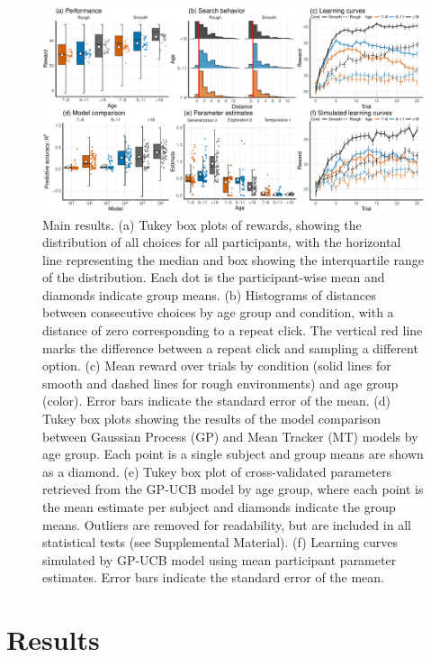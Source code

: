 \documentclass[a4paper,man, floatsintext, natbib]{apa6}
\begin{document}
\begin{figure}[ht!]
\centering
\includegraphics[width=\linewidth]{bigplot.pdf}
\caption{Main results. (a) Tukey box plots of rewards, showing the distribution of all choices for all participants, with the horizontal line representing the median and box showing the interquartile range of the distribution. Each dot is the participant-wise mean and diamonds indicate group means. (b) Histograms of distances between consecutive choices by age group and condition, with a distance of zero corresponding to a repeat click. The vertical red line marks the difference between a repeat click and sampling a different option. (c) Mean reward over trials by condition (solid lines for smooth and dashed lines for rough environments) and age group (color). Error bars indicate the standard error of the mean. (d) Tukey box plots showing the results of the model comparison between Gaussian Process (GP) and Mean Tracker (MT) models by age group. Each point is a single subject and group means are shown as a diamond. (e) Tukey box plot of cross-validated parameters retrieved from the GP-UCB model by age group, where each point is the mean estimate per subject and diamonds indicate the group means. Outliers are removed for readability, but are included in all statistical tests (see Supplemental Material). (f) Learning curves simulated by GP-UCB model using mean participant parameter estimates. Error bars indicate the standard error of the mean.} 
\label{fig:behavioral} 
\end{figure}

\section{Results}
\end{document}

